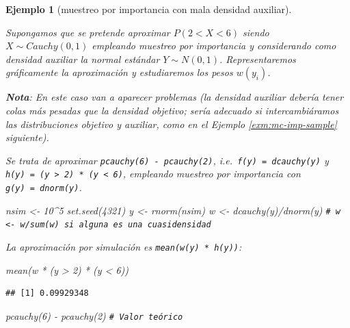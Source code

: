 \documentclass[
]{book}
\newenvironment{Shaded}{\begin{snugshade}}{\end{snugshade}}
\newcommand{\CommentTok}[1]{\textcolor[rgb]{0.56,0.35,0.01}{\textit{#1}}}
\newcommand{\DecValTok}[1]{\textcolor[rgb]{0.00,0.00,0.81}{#1}}
\newcommand{\FunctionTok}[1]{\textcolor[rgb]{0.00,0.00,0.00}{#1}}
\newcommand{\NormalTok}[1]{#1}
\newcommand{\OtherTok}[1]{\textcolor[rgb]{0.56,0.35,0.01}{#1}}
\newcommand{\SpecialCharTok}[1]{\textcolor[rgb]{0.00,0.00,0.00}{#1}}
\theoremstyle{break}
\newtheorem{example}{Ejemplo}[chapter]
\theoremstyle{nonumberplain}
\renewcommand{\CommentTok}[1]{\textcolor[rgb]{0.41,0.41,0.41}{\texttt{#1}}}
\begin{document}
\begin{example}[muestreo por importancia con mala densidad auxiliar]
\protect\hypertarget{exm:mc-imp2}{}\label{exm:mc-imp2}

Supongamos que se pretende aproximar \(P\left(2<X<6\right)\) siendo \(X\sim Cauchy(0,1)\) empleando muestreo por importancia y considerando como densidad auxiliar la normal estándar \(Y\sim N(0,1)\). Representaremos gráficamente la aproximación y estudiaremos los pesos \(w(y_i)\).

\textbf{Nota}: En este caso van a aparecer problemas
(la densidad auxiliar debería tener colas más pesadas que la densidad objetivo;
sería adecuado si intercambiáramos las distribuciones objetivo y auxiliar,
como en el Ejemplo \ref{exm:mc-imp-sample} siguiente).

Se trata de aproximar \texttt{pcauchy(6)\ -\ pcauchy(2)},
i.e.~\texttt{f(y)\ =\ dcauchy(y)} y \texttt{h(y)\ =\ (y\ \textgreater{}\ 2)\ *\ (y\ \textless{}\ 6)},
empleando muestreo por importancia con \texttt{g(y)\ =\ dnorm(y)}.

\begin{Shaded}
\begin{Highlighting}[]
\NormalTok{nsim }\OtherTok{\textless{}{-}} \DecValTok{10}\SpecialCharTok{\^{}}\DecValTok{5}
\FunctionTok{set.seed}\NormalTok{(}\DecValTok{4321}\NormalTok{)}
\NormalTok{y }\OtherTok{\textless{}{-}} \FunctionTok{rnorm}\NormalTok{(nsim)}
\NormalTok{w }\OtherTok{\textless{}{-}} \FunctionTok{dcauchy}\NormalTok{(y)}\SpecialCharTok{/}\FunctionTok{dnorm}\NormalTok{(y) }\CommentTok{\# w \textless{}{-} w/sum(w) si alguna es una cuasidensidad}
\end{Highlighting}
\end{Shaded}

La aproximación por simulación es \texttt{mean(w(y)\ *\ h(y))}:

\begin{Shaded}
\begin{Highlighting}[]
\FunctionTok{mean}\NormalTok{(w }\SpecialCharTok{*}\NormalTok{ (y }\SpecialCharTok{\textgreater{}} \DecValTok{2}\NormalTok{) }\SpecialCharTok{*}\NormalTok{ (y }\SpecialCharTok{\textless{}} \DecValTok{6}\NormalTok{)) }
\end{Highlighting}
\end{Shaded}

\begin{verbatim}
## [1] 0.09929348
\end{verbatim}

\begin{Shaded}
\begin{Highlighting}[]
\FunctionTok{pcauchy}\NormalTok{(}\DecValTok{6}\NormalTok{) }\SpecialCharTok{{-}} \FunctionTok{pcauchy}\NormalTok{(}\DecValTok{2}\NormalTok{)  }\CommentTok{\# Valor teórico}
\end{Highlighting}
\end{Shaded}


\end{example}
\end{document}
